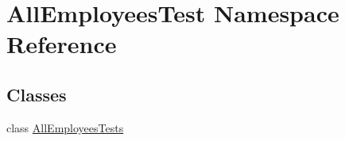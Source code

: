 \hypertarget{namespace_all_employees_test}{}\section{All\+Employees\+Test Namespace Reference}
\label{namespace_all_employees_test}
\subsection*{Classes}
\begin{DoxyCompactItemize}
\item 
class \hyperlink{class_all_employees_test_1_1_all_employees_tests}{All\+Employees\+Tests}
\end{DoxyCompactItemize}
